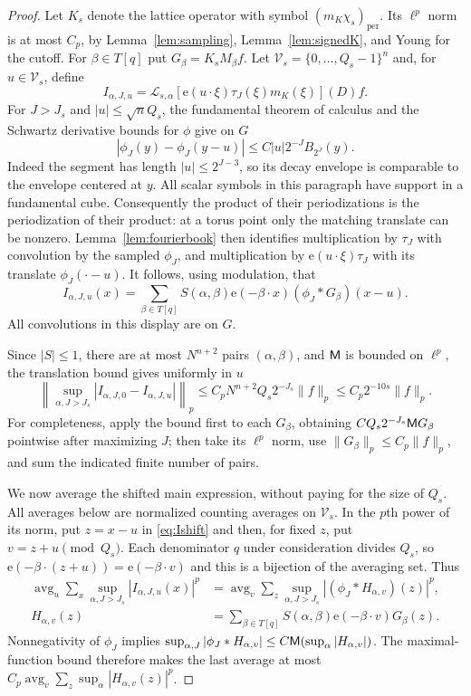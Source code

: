 \documentclass[11pt,oneside]{article}
\theoremstyle{definition}\newtheorem{definition}[theorem]{Definition}
\theoremstyle{remark}\newtheorem{remark}[theorem]{Remark}
\newcommand{\ee}[1]{\mathrm e\!\left(#1\right)}
\newcommand{\av}{\mathop{\mathrm{avg}}}\newcommand{\E}{\mathbb E}\newcommand{\Prb}{\mathbb P}
\newcommand{\Lift}{\mathcal L}\newcommand{\Aop}{\mathcal A}\newcommand{\Dop}{\mathcal D}
\begin{document}
\begin{proof}
Let $K_s$ denote the lattice operator with symbol
$(m_K\chi_s)_{\mathrm{per}}$. Its $\ell^p$ norm is at most $C_p$, by
Lemma~\ref{lem:sampling}, Lemma~\ref{lem:signedK}, and Young for the cutoff.
For $\beta\in T[q]$ put $G_\beta=K_sM_\beta f$.
Let $\mathcal V_s=\{0,\ldots,Q_s-1\}^n$ and, for $u\in\mathcal V_s$, define
\[
 I_{\alpha,J,u}=\Lift_{s,\alpha}[\ee{u\cdot\xi}\tau_J(\xi)m_K(\xi)](D)f.
\]
For $J>J_s$ and $|u|\leq\sqrt nQ_s$, the fundamental theorem of calculus
and the Schwartz derivative bounds for $\phi$ give on $G$
\[
 |\phi_J(y)-\phi_J(y-u)|\leq C|u|2^{-J}B_{2^J}(y).
\]
Indeed the segment has length $|u|\leq2^{J-3}$, so its decay envelope is
comparable to the envelope centered at $y$.
All scalar symbols in this paragraph have support in a fundamental cube.
Consequently the product of their periodizations is the periodization of
their product: at a torus point only the matching translate can be nonzero.
Lemma~\ref{lem:fourierbook} then identifies multiplication by $\tau_J$ with
convolution by the sampled $\phi_J$, and multiplication by
$\ee{u\cdot\xi}\tau_J$ with its translate $\phi_J(\cdot-u)$.
It follows, using modulation, that
\begin{equation}\label{eq:Ishift}
 I_{\alpha,J,u}(x)=\sum_{\beta\in T[q]}S(\alpha,\beta)\ee{-\beta\cdot x}
                                    (\phi_J*G_\beta)(x-u).
\end{equation}
All convolutions in this display are on $G$.

Since $|S|\leq1$, there are at most $N^{n+2}$ pairs $(\alpha,\beta)$, and
$\mathsf M$ is bounded on $\ell^p$, the translation bound gives uniformly in $u$
\begin{equation}\label{eq:shifterror}
 \left\|\sup_{\alpha,J>J_s}|I_{\alpha,J,0}-I_{\alpha,J,u}|\right\|_p
 \leq C_pN^{n+2}Q_s2^{-J_s}\|f\|_p
 \leq C_p2^{-10s}\|f\|_p.
\end{equation}
For completeness, apply the bound first to each $G_\beta$, obtaining
$CQ_s2^{-J_s}\mathsf M G_\beta$ pointwise after maximizing $J$; then take its
$\ell^p$ norm, use $\|G_\beta\|_p\leq C_p\|f\|_p$, and sum the indicated
finite number of pairs.

We now average the shifted main expression, without paying for the size of
$Q_s$. All averages below are normalized counting averages on $\mathcal V_s$.
In the $p$th power of its norm, put $z=x-u$ in \eqref{eq:Ishift} and then,
for fixed $z$, put $v=z+u\pmod{Q_s}$. Each denominator $q$ under consideration
divides $Q_s$, so $\ee{-\beta\cdot(z+u)}=\ee{-\beta\cdot v}$ and this is a
bijection of the averaging set. Thus
\begin{align*}
 \av_u\sum_x\sup_{\alpha,J>J_s}|I_{\alpha,J,u}(x)|^p
 &=\av_v\sum_z\sup_{\alpha,J>J_s}|(\phi_J*H_{\alpha,v})(z)|^p,\\
 H_{\alpha,v}(z)&=\sum_{\beta\in T[q]}S(\alpha,\beta)
                                     \ee{-\beta\cdot v}G_\beta(z).
\end{align*}
Nonnegativity of $\phi_J$ implies
$\sup_{\alpha,J}|\phi_J*H_{\alpha,v}|
 \leq C\mathsf M(\sup_\alpha|H_{\alpha,v}|)$.
The maximal-function bound therefore makes the last average at most
$C_p\av_v\sum_z\sup_\alpha|H_{\alpha,v}(z)|^p$.


\end{proof}
\end{document}
